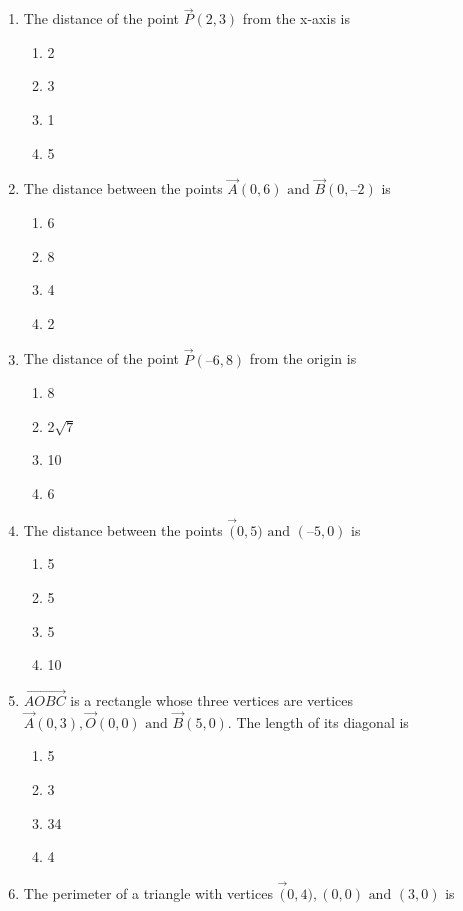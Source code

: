 
\begin{enumerate}[label=\thesection.\arabic*,ref=\thesection.\theenumi]
	\item The distance of the point $\vec{P}(2, 3)$ from the x-axis is

\begin{enumerate}
\item 2
\item 3
\item 1
\item 5 
\end{enumerate}
\item The distance between the points $\vec{A}(0, 6) \text{ and } \vec{B}(0, –2)$ is
	\begin{enumerate}
\item 6
\item 8
\item 4	
\item 2
	\end{enumerate}
\item The distance of the point $\vec{P} (–6, 8)$ from the origin is
\begin{enumerate}

\item 8
\item 2$\sqrt{7}$ 
\item 10
\item 6
\end{enumerate}
\item The distance between the points $\vec(0, 5)\text{ and }(–5, 0)$ is
\begin{enumerate}

\item 5
\item 5
\item 5
\item 10
\end{enumerate}
\item $\vec{AOBC}$ is a rectangle whose three vertices are vertices $\vec{A} (0, 3), \vec{O}(0, 0)\text{ and }
	\vec{B} (5, 0)$. The length of its diagonal is
\begin{enumerate}
\item 5
\item3
\item 34
\item 4
\end{enumerate}
\item The perimeter of a triangle with vertices $\vec(0, 4), (0, 0) \text{ and } (3, 0)$ is
\begin{enumerate}


\end{enumerate}
\end{enumerate}

